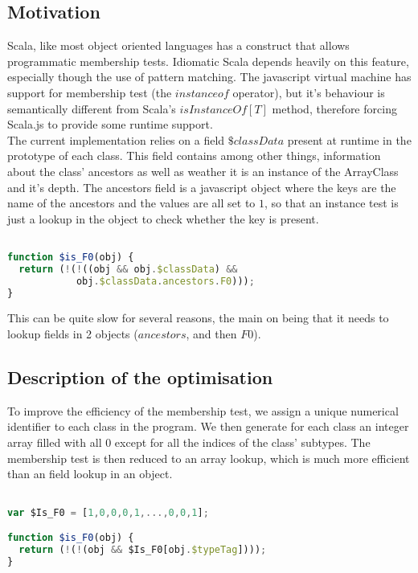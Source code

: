 \subsection{Motivation}
Scala, like most object oriented languages has a construct that allows
programmatic membership tests. Idiomatic Scala depends heavily on this feature,
especially though the use of pattern matching.
The javascript virtual machine has support for membership test (the
$instanceof$ operator), but it's behaviour is semantically different from
Scala's $isInstanceOf[T]$ method, therefore forcing Scala.js to provide some
runtime support. \\
The current implementation relies on a field $\$classData$ present at
runtime in the prototype of each class. This field contains among other things,
information about the class' ancestors as well as weather it is an instance of
the ArrayClass and it's depth. The ancestors field is a javascript object where
the keys are the name of the ancestors and the values are all set to $1$, so
that an instance test is just a lookup in the object to check whether the key
is present. 

\begin{lstlisting}[language=javascript,caption=Old membership test,
label={lst:oldIsInstanceOf}]

function $is_F0(obj) {
  return (!(!((obj && obj.$classData) && 
            obj.$classData.ancestors.F0)));
}

\end{lstlisting}
This can be quite slow for several reasons, the main on being that it needs to
lookup fields in 2 objects ($ancestors$, and then $F0$).\\

\subsection{Description of the optimisation}
To improve the efficiency of the membership test, we assign a unique numerical
identifier to each class in the program. We then generate for each class an
integer array filled with all 0 except for all the indices of the class'
subtypes. The membership test is then reduced to an array lookup, which is much
more efficient than an field lookup in an object. 

\begin{lstlisting}[language=javascript,caption=New membership test,
label={lst:newIsInstanceOf}]

var $Is_F0 = [1,0,0,0,1,...,0,0,1];

function $is_F0(obj) {
  return (!(!(obj && $Is_F0[obj.$typeTag])));
}

\end{lstlisting}

